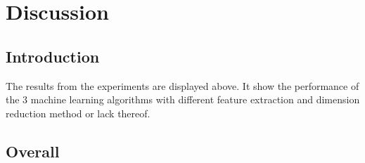 \chapter{Discussion}

\section{Introduction}
The results from the experiments are displayed above. It show the performance of the 3 machine learning algorithms with different feature extraction and dimension reduction method or lack thereof.

\section{Overall}
